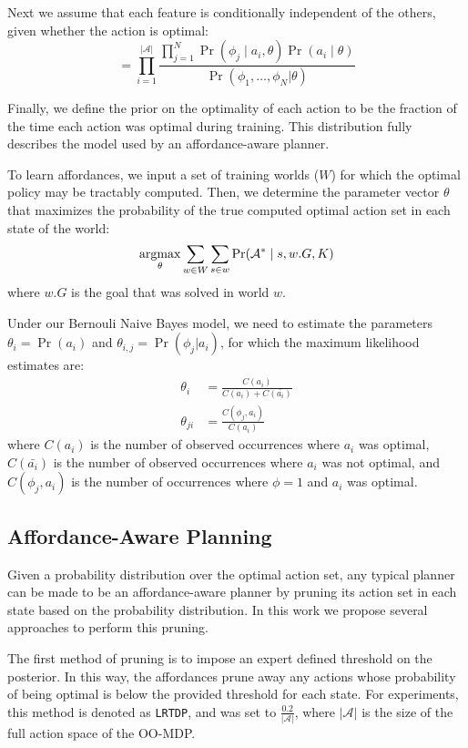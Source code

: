 \documentclass[letterpaper]{article}
\newcommand{\argmax}{\operatornamewithlimits{argmax}} %
\begin{document}
Next we assume that each feature is conditionally independent of the others, given whether the action is optimal:
\begin{equation}
= \prod_{i=1}^{|\mathcal{A}|} \frac{\prod_{j=1}^{N} \Pr(\phi_j \mid a_i, \theta) \Pr(a_i \mid \theta) }{\Pr(\phi_1, \ldots, \phi_{N} | \theta)}
\label{eq:final}
\end{equation}

Finally, we define the prior on the optimality of each action to be the fraction of the
time each action was optimal during training. This distribution fully describes the model used by an affordance-aware planner. 

To learn affordances, we input a set of training worlds ($W$) for which the optimal policy
may be tractably computed. Then, we determine the parameter vector $\theta$ that 
maximizes the probability of the true computed optimal action set in each state of the world:
\begin{equation}
\argmax_\theta \sum_{w \in W} \sum_{s \in w} \Pr(\mathcal{A}^* \mid s, w.G, K)
\end{equation}
where $w.G$ is the goal that was solved in world $w$.

Under our Bernouli Naive Bayes model, we need to estimate the parameters
$\theta_i = \Pr(a_i)$ and $\theta_{i,j} = \Pr(\phi_j | a_i)$, for which the maximum likelihood estimates are:
\begin{align}
\theta_i &= \frac{C(a_i)}{C(a_i) + C(\bar{a_i})} \\
\theta_{ji} &= \frac{C(\phi_j, a_i)}{C(a_i)}
\end{align}
where $C(a_i)$ is the number of observed occurrences where $a_i$ was optimal,
$C(\bar{a_i})$ is the number of observed occurrences where $a_i$ was not optimal,
and $C(\phi_j, a_i)$ is the number of occurrences where $\phi=1$ and $a_i$ was optimal.

\subsection{Affordance-Aware Planning}
\label{sec:action_pruning}
Given a probability distribution over the optimal action set, any typical
planner can be made to be an affordance-aware planner by pruning its action
set in each state based on the probability distribution. In this work we propose several
approaches to perform this pruning.

The first method of pruning is to impose an expert defined threshold on the posterior. In this way, the affordances prune away any actions whose probability of being optimal is below the provided threshold for each state. For experiments, this method is denoted as \texttt{LRTDP}, and was set to $\frac{0.2}{|\mathcal{A}|}$, where $|\mathcal{A}|$ is the size of the full action space of the OO-MDP.
\end{document}
